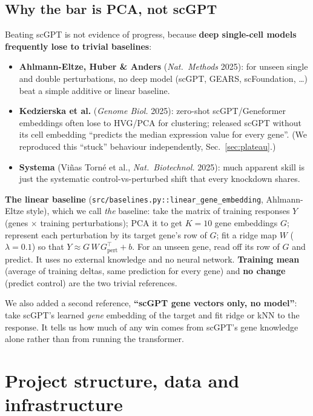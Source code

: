 \documentclass[11pt]{article}
\newcommand{\code}[1]{\texttt{\small #1}}
\begin{document}
\subsection{Why the bar is PCA, not scGPT}\label{sec:pca}
Beating scGPT is not evidence of progress, because \textbf{deep single-cell models frequently lose to trivial baselines}:
\begin{itemize}
\item \textbf{Ahlmann-Eltze, Huber \& Anders} (\emph{Nat.\ Methods} 2025): for unseen single and double perturbations, no deep model (scGPT, GEARS, scFoundation, \dots) beat a simple additive or linear baseline.
\item \textbf{Kedzierska et al.} (\emph{Genome Biol.} 2025): zero-shot scGPT/Geneformer embeddings often lose to HVG/PCA for clustering; released scGPT without its cell embedding ``predicts the median expression value for every gene''. (We reproduced this ``stuck'' behaviour independently, Sec.~\ref{sec:plateau}.)
\item \textbf{Systema} (Vi\~nas Torn\'e et al., \emph{Nat.\ Biotechnol.} 2025): much apparent skill is just the systematic control-vs-perturbed shift that every knockdown shares.
\end{itemize}

\textbf{The linear baseline} (\code{src/baselines.py::linear\_gene\_embedding}, Ahlmann-Eltze style), which we call \emph{the} baseline: take the matrix of training responses $Y$ (genes $\times$ training perturbations); PCA it to get $K=10$ gene embeddings $G$; represent each perturbation by its target gene's row of $G$; fit a ridge map $W$ ($\lambda=0.1$) so that $Y \approx G\,W\,G_{\text{pert}}^{\top} + b$. For an unseen gene, read off its row of $G$ and predict. It uses no external knowledge and no neural network. \textbf{Training mean} (average of training deltas, same prediction for every gene) and \textbf{no change} (predict control) are the two trivial references.

We also added a second reference, \textbf{``scGPT gene vectors only, no model''}: take scGPT's learned \emph{gene} embedding of the target and fit ridge or kNN to the response. It tells us how much of any win comes from scGPT's gene knowledge alone rather than from running the transformer.

\section{Project structure, data and infrastructure}
\end{document}
